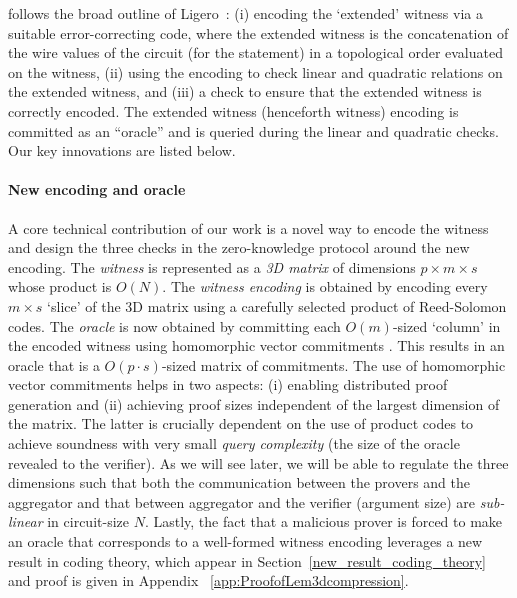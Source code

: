 \name{} follows the broad outline of Ligero~\cite{ligero}: 
(i) encoding the `extended' witness via a suitable error-correcting code, where the extended witness is the concatenation of the wire values of the circuit (for the statement) in a topological order evaluated on the witness, (ii) using the
encoding to check linear and quadratic relations on the extended
witness, and (iii) a check to ensure that the extended witness is correctly
encoded. The extended witness (henceforth witness) encoding is committed as an ``oracle'' and is queried
during the linear and quadratic checks.  Our key innovations are
listed below. 

\paragraph{New encoding and oracle} A core technical contribution of our
work is a novel way to encode the witness and design the three checks in
the zero-knowledge protocol around the new encoding. The \textit{witness} is
represented as a \textit{3D matrix} of dimensions $p \times m \times s$ whose
product is $O(N)$. The \textit{witness encoding} is obtained by encoding every
$m \times s$ `slice' of the 3D matrix using a carefully selected product of
Reed-Solomon codes.  The \textit{oracle} is now obtained by committing each $O(m)$-sized `column' in 
the encoded witness using homomorphic vector commitments \cite{Ped92}. 
This results in an oracle that is a $O(p \cdot s)$-sized matrix of commitments.
The use of homomorphic vector commitments helps in two aspects: (i) enabling
distributed proof generation and (ii) achieving proof sizes independent of the
largest dimension of the matrix. The latter is crucially dependent on the use
of product codes to achieve soundness with very small {\em query complexity} (the size of the
oracle revealed to the verifier).
As we will see later, we will be able to regulate the three dimensions such that
both the communication between the provers and the
aggregator and that between aggregator and the verifier (argument size) are 
{\em sub-linear} in circuit-size $N$.   Lastly, the fact that a malicious prover is forced to make an oracle that corresponds to
a well-formed witness encoding leverages a new result in coding theory, which appear in Section~\ref{new_result_coding_theory} and proof is given in Appendix ~\ref{app:ProofofLem3dcompression}. 

